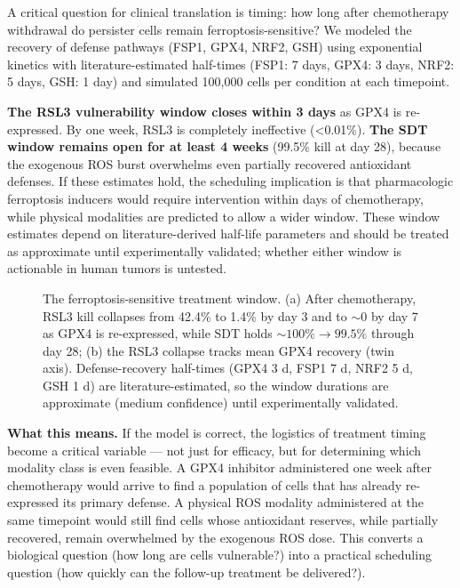 \documentclass[11pt,twoside,openright]{report}
\begin{document}
A critical question for clinical translation is timing: how long after chemotherapy withdrawal do persister cells remain ferroptosis-sensitive? We modeled the recovery of defense pathways (FSP1, GPX4, NRF2, GSH) using exponential kinetics with literature-estimated half-times (FSP1: 7 days, GPX4: 3 days, NRF2: 5 days, GSH: 1 day) and simulated 100,000 cells per condition at each timepoint.











\textbf{The RSL3 vulnerability window closes within 3 days} as GPX4 is re-expressed. By one week, RSL3 is completely ineffective (<0.01\%). \textbf{The SDT window remains open for at least 4 weeks} (99.5\% kill at day 28), because the exogenous ROS burst overwhelms even partially recovered antioxidant defenses. If these estimates hold, the scheduling implication is that pharmacologic ferroptosis inducers would require intervention within days of chemotherapy, while physical modalities are predicted to allow a wider window. These window estimates depend on literature-derived half-life parameters and should be treated as approximate until experimentally validated; whether either window is actionable in human tumors is untested.

\begin{figure}[tbp]
\setcounter{figure}{22}
\caption{The ferroptosis-sensitive treatment window. (a) After chemotherapy, RSL3 kill collapses from 42.4\% to 1.4\% by day 3 and to ${\sim}0$ by day 7 as GPX4 is re-expressed, while SDT holds ${\sim}100\%{\to}99.5\%$ through day 28; (b) the RSL3 collapse tracks mean GPX4 recovery (twin axis). Defense-recovery half-times (GPX4 3 d, FSP1 7 d, NRF2 5 d, GSH 1 d) are literature-estimated, so the window durations are approximate (medium confidence) until experimentally validated.}
\label{fig:fig26_vulnerability_window}
\end{figure}

\textbf{What this means.} If the model is correct, the logistics of treatment timing become a critical variable --- not just for efficacy, but for determining which modality class is even feasible. A GPX4 inhibitor administered one week after chemotherapy would arrive to find a population of cells that has already re-expressed its primary defense. A physical ROS modality administered at the same timepoint would still find cells whose antioxidant reserves, while partially recovered, remain overwhelmed by the exogenous ROS dose. This converts a biological question (how long are cells vulnerable?) into a practical scheduling question (how quickly can the follow-up treatment be delivered?).
\end{document}
